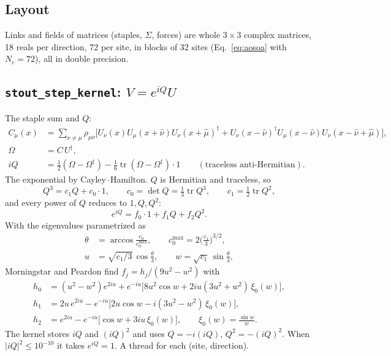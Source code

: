 \documentclass[11pt,a4paper]{article}
\numberwithin{equation}{section}
\newcommand{\code}[1]{\texttt{\small #1}}
\newcommand{\dg}{^{\dagger}}
\newcommand{\tr}{\operatorname{tr}}
\begin{document}
\subsection{Layout}

Links and fields of matrices (staples, $\Sigma$, forces) are whole $3\times3$ complex matrices,
18 reals per direction, 72 per site, in blocks of 32 sites (Eq.~\eqref{eq:aosoa} with $N_c=72$), all in double precision.

\subsection{\code{stout\_step\_kernel}: $V = e^{iQ}U$}

The staple sum and $Q$:
\begin{align}
C_\mu(x) &= \sum_{\nu\ne\mu}\rho_{\mu\nu}\Big[U_\nu(x)U_\mu(x+\hat\nu)U_\nu(x+\hat\mu)\dg + U_\nu(x-\hat\nu)\dg U_\mu(x-\hat\nu)U_\nu(x-\hat\nu+\hat\mu)\Big],\\
\Omega &= C\,U\dg,\\
iQ &= \tfrac12(\Omega-\Omega\dg) - \tfrac16\tr(\Omega-\Omega\dg)\cdot1\qquad(\text{traceless anti-Hermitian}).
\end{align}
The exponential by Cayley–Hamilton. $Q$ is Hermitian and traceless, so
\begin{equation}
Q^3 = c_1Q + c_0\cdot1,\qquad c_0 = \det Q = \tfrac13\tr Q^3,\qquad c_1 = \tfrac12\tr Q^2,
\end{equation}
and every power of $Q$ reduces to $1,Q,Q^2$:
\begin{equation}
e^{iQ} = f_0\cdot1 + f_1Q + f_2Q^2 .
\end{equation}
With the eigenvalues parametrized as
\begin{align}
\theta &= \arccos\frac{c_0}{c_0^{\max}},\qquad c_0^{\max} = 2\Big(\frac{c_1}{3}\Big)^{3/2},\\
u &= \sqrt{c_1/3}\,\cos\frac\theta3,\qquad w = \sqrt{c_1}\,\sin\frac\theta3,
\end{align}
Morningstar and Peardon find $f_j = h_j/(9u^2-w^2)$ with
\begin{align}
h_0 &= (u^2-w^2)e^{2iu} + e^{-iu}\big[8u^2\cos w + 2iu(3u^2+w^2)\,\xi_0(w)\big],\\
h_1 &= 2u\,e^{2iu} - e^{-iu}\big[2u\cos w - i(3u^2-w^2)\,\xi_0(w)\big],\\
h_2 &= e^{2iu} - e^{-iu}\big[\cos w + 3iu\,\xi_0(w)\big],\qquad \xi_0(w)=\frac{\sin w}{w}.
\end{align}
The kernel stores $iQ$ and $(iQ)^2$ and uses $Q=-i(iQ)$, $Q^2=-(iQ)^2$. When $|iQ|^2\le10^{-10}$ it
takes $e^{iQ}=1$. A thread for each (site, direction).
\end{document}

